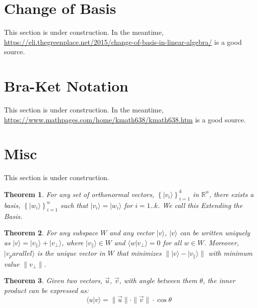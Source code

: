 \documentclass{amsbook}
\newtheorem{theorem}{Theorem}
\begin{document}
\section{Change of Basis}\label{Change of Basis}

This section is under construction.  In the meantime, \url{https://eli.thegreenplace.net/2015/change-of-basis-in-linear-algebra/} is a good source.

\section{Bra-Ket Notation}\label{Bra-Ket Notation}

This section is under construction.  In the meantime, \url{https://www.mathpages.com/home/kmath638/kmath638.htm} is a good source.

\section{Misc}

This section is under construction.

\begin{theorem}
\label{ExtendBasis}
For any set of orthonormal vectors, $\left\{|v_i\rangle\right\}_{i=1}^k$ in $\mathbb R^n$, there exists a basis, $\left\{|w_i\rangle\right\}_{i=1}^n$ such that $|v_i\rangle=|w_i\rangle$ for $i=1..k$.  We call this {\em Extending the Basis}.
\end{theorem}

\begin{theorem}
\label{VectorDecomposition}
For any subspace $W$ and any vector $|v\rangle$, $|v\rangle$ can be written uniquely as $|v\rangle=|v_\parallel\rangle+|v_\bot\rangle$, where $|v_\parallel\rangle\in W$ and $\langle w|v_\bot\rangle=0$ for all $w\in W$.  Moreover, $|v_parallel\rangle$ is the unique vector in $W$ that minimizes $\| |v\rangle-|v_\parallel\rangle \|$ with minimum value $\|v_\bot\|$.
\end{theorem}

\begin{theorem}
\label{CosineSimilarity}
Given two vectors, $\vec u$, $\vec v$, with angle between them $\theta$, the inner product can be expressed as:
$$
\langle u|v\rangle = \|\vec u\|\cdot\|\vec v\|\cdot\cos\theta
$$
\end{theorem}
\end{document}
